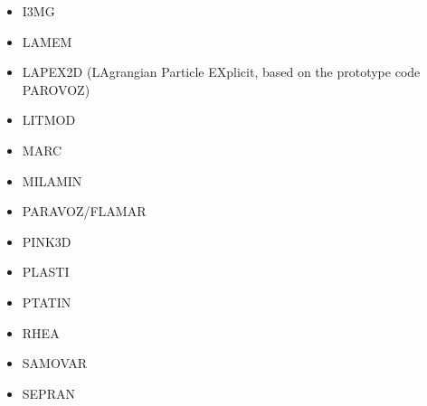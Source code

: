 \begin{itemize}
\item I3MG
\cite{facc14}

\item LAMEM
\cite{scbe08}
\cite{kamm10}
\cite{lemk11}
\cite{may12}
\cite{lesh14}
\cite{cokm14}
\cite{bakp14}
\cite{feka14a}
\cite{feka14b}
\cite{puka15}
\cite{feka15}
\cite{cofk15}
\cite{kapb16}

\item LAPEX2D (LAgrangian Particle EXplicit, based on the prototype code PAROVOZ) 
\cite{sopg05}
\cite{bbeg06}\cite{basv06}
\cite{baso08}
\cite{scbe08}
\cite{sosk11}


\item LITMOD
\cite{afrf07}
\cite{affr08}
\cite{fuac09}
\cite{fufa10}


\item MARC
\cite{nesg97}
\cite{nesb99}


\item MILAMIN
\cite{daks08}
\cite{yakm11}
\cite{gebk12}
\cite{jobk14}
\cite{lukz15}\cite{gehm15}\cite{thkp15}
\cite{jads16}\cite{maka16}



\item PARAVOZ/FLAMAR
\cite{poli93}
\cite{bujl01}\cite{bupo01}
\cite{bast02}\cite{clbb02}
\cite{hags03}\cite{gehd03}
\cite{guhl04}\cite{gewi04}\cite{toba04}\cite{tibb04}
\cite{bugu05}
\cite{yaab07}\cite{buto07}
\cite{yaba08}\cite{tibb08}
\cite{gecm09}\cite{yahb09}
\cite{anwb12}\cite{gech12}\cite{gubc12}\cite{gerb12}\cite{fagm12}
\cite{frba14}\cite{gagb14}\cite{bufa14}
\cite{wulc15}\cite{marl15}\cite{gebw15}\cite{svlh15}




\item PINK3D
\cite{vosc15}


\item PLASTI
\cite{fuwb06}



\item PTATIN
\cite{phil13}
\cite{mabl14}
\cite{mabl15}
\cite{lemh17}
\cite{jolp18}
\cite{jolm19}


\item RHEA
\cite{bugg08}
\cite{stgb10}
\cite{algs12}
\cite{busa13}

\item SAMOVAR
\cite{egat10}

\item SEPRAN
\cite{beky93}
\cite{vlvv94}
\cite{civv02}
\cite{vavv02}
\cite{vavs03}
\cite{vavv04}
\cite{vavv04b}
\cite{vavv05}
\cite{sepr05}
\cite{liva06a}
\cite{liva06b}
\cite{vant07}
\cite{civv07}
\cite{brva07a}
\cite{brva07b}
\cite{plva08}
\cite{vavl09}
\cite{vahy10}
\cite{syva10}
\cite{vahs11}
\cite{besy12}
\cite{beva12}
\cite{chgv12}
\cite{ancv13}
\cite{chsg14}
\cite{mova14}
\cite{vasy15}
\cite{zhdv19}


\end{itemize}
